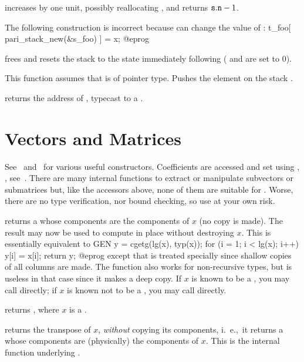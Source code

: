  increases  by one unit,
possibly reallocating , and returns ${\tt s.n}-1$.

 The following construction is incorrect because
 can change the value of :
\bprog
t_foo[ pari_stack_new(&s_foo) ] = x;
@eprog

 frees  and resets the
stack to the state immediately following  ( and
 are set to $0$).

 This function assumes
that  is of pointer type. Pushes the element  on the stack
.

 returns the address of ,
typecast to a .

\section{Vectors and Matrices}

See~ and~ for various useful constructors.
Coefficients are accessed and set using , ,
see~. There are many internal functions to extract or
manipulate subvectors or submatrices but, like the accessors above, none of
them are suitable for . Worse, there are no type
verification, nor bound checking, so use at your own risk.

 returns a  whose components are the
components of $x$ (no copy is made). The result may now be used to compute in
place without destroying $x$. This is essentially equivalent to
\bprog
  GEN y = cgetg(lg(x), typ(x));
  for (i = 1; i < lg(x); i++) y[i] = x[i];
  return y;
@eprog\noindent
except that  is treated specially since shallow copies of all columns
are made. The function also works for non-recursive types, but is useless
in that case since it makes a deep copy. If $x$ is known to be a , you
may call  directly; if $x$ is known not to be a ,
you may call  directly.

 returns , where $x$
is a .

 returns the transpose of $x$, \emph{without}
copying its components, i.~e.,~it returns a  whose components are
(physically) the components of $x$. This is the internal function underlying
.

